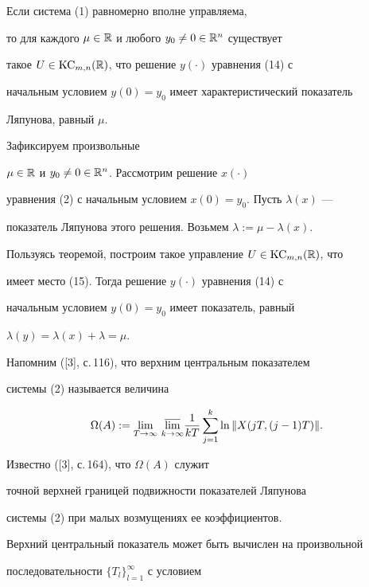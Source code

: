 \begin{cor} Если система (1) равномерно вполне управляема,


то для каждого $\mu\in\Bbb R$ и любого $y_{0}\ne 0\in\Bbb R^n$ существует


такое $U\in\operatorname{KC}_{m,n}(\Bbb R)$, что решение $y(\cdot)$ уравнения (14) с


начальным условием $y(0)=y_{0}$ имеет характеристический показатель


Ляпунова, равный $\mu$.


\end{cor}





\begin{pf} Зафиксируем произвольные


$\mu\in\Bbb R$ и $y_{0}\ne 0\in\Bbb R^n$. Рассмотрим решение $x(\cdot)$


уравнения (2) с начальным условием $x(0)=y_{0}$. Пусть $\lambda(x)$ ---


показатель Ляпунова этого решения. Возьмем $\lambda:=\mu-\lambda(x)$.


Пользуясь теоремой, построим такое управление $U\in\operatorname{KC}_{m,n}(\Bbb R)$, что


имеет место (15). Тогда решение $y(\cdot)$ уравнения (14) с


начальным условием $y(0)=y_{0}$ имеет показатель, равный


$\lambda(y)=\lambda(x)+\lambda=\mu$.


\end{pf}





Напомним ([3], с.\,116), что верхним центральным показателем


системы (2) называется величина


$$


\Omega(A):=\lim_{T\to\infty}\,\mylim{k}


\frac{1}{kT}\sum_{j=1}^{k}\ln\|X(jT,(j-1)T)\|.


$$


Известно ([3], с.\,164), что $\Omega(A)$ служит


точной верхней границей подвижности показателей Ляпунова


системы (2) при малых возмущениях ее коэффициентов.


Верхний центральный показатель может быть вычислен на произвольной


последовательности $\{T_{l}\}_{l=1}^{\infty}$ с условием


